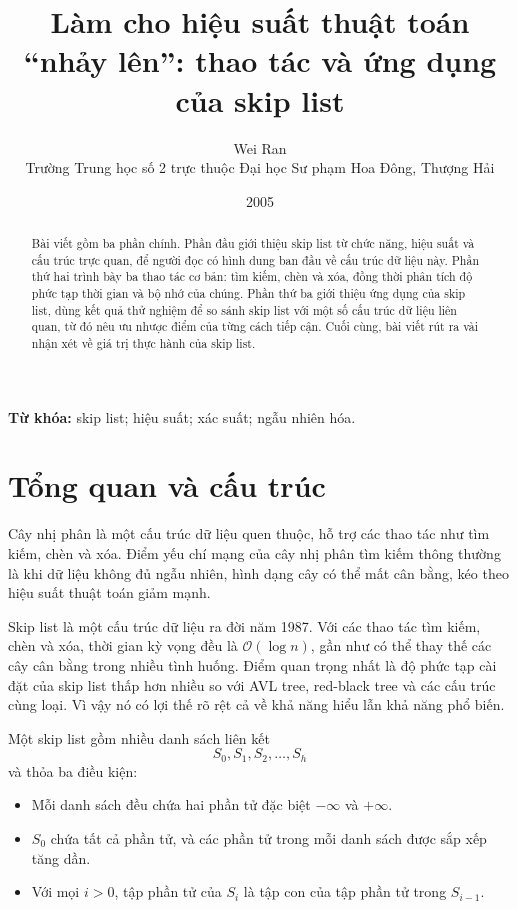 \documentclass[11pt]{article}
\title{Làm cho hiệu suất thuật toán ``nhảy lên'': thao tác và ứng dụng của skip list}
\author{Wei Ran\\Trường Trung học số 2 trực thuộc Đại học Sư phạm Hoa Đông, Thượng Hải}
\date{2005}
\newcommand{\Oh}{\mathcal{O}}
\begin{document}
\maketitle


\renewcommand{\abstractname}{Tóm tắt}
\begin{abstract}
Bài viết gồm ba phần chính. Phần đầu giới thiệu skip list từ chức năng, hiệu
suất và cấu trúc trực quan, để người đọc có hình dung ban đầu về cấu trúc dữ
liệu này. Phần thứ hai trình bày ba thao tác cơ bản: tìm kiếm, chèn và xóa,
đồng thời phân tích độ phức tạp thời gian và bộ nhớ của chúng. Phần thứ ba
giới thiệu ứng dụng của skip list, dùng kết quả thử nghiệm để so sánh skip
list với một số cấu trúc dữ liệu liên quan, từ đó nêu ưu nhược điểm của từng
cách tiếp cận. Cuối cùng, bài viết rút ra vài nhận xét về giá trị thực hành
của skip list.
\end{abstract}

\noindent\textbf{Từ khóa:} skip list; hiệu suất; xác suất; ngẫu nhiên hóa.

\section{Tổng quan và cấu trúc}

Cây nhị phân là một cấu trúc dữ liệu quen thuộc, hỗ trợ các thao tác như tìm
kiếm, chèn và xóa. Điểm yếu chí mạng của cây nhị phân tìm kiếm thông thường
là khi dữ liệu không đủ ngẫu nhiên, hình dạng cây có thể mất cân bằng, kéo
theo hiệu suất thuật toán giảm mạnh.

Skip list là một cấu trúc dữ liệu ra đời năm 1987. Với các thao tác tìm kiếm,
chèn và xóa, thời gian kỳ vọng đều là \(\Oh(\log n)\), gần như có thể thay thế
các cây cân bằng trong nhiều tình huống. Điểm quan trọng nhất là độ phức tạp
cài đặt của skip list thấp hơn nhiều so với AVL tree, red-black tree và các
cấu trúc cùng loại. Vì vậy nó có lợi thế rõ rệt cả về khả năng hiểu lẫn khả
năng phổ biến.

Một skip list gồm nhiều danh sách liên kết
\[
  S_0,S_1,S_2,\ldots,S_h
\]
và thỏa ba điều kiện:
\begin{itemize}
  \item Mỗi danh sách đều chứa hai phần tử đặc biệt \(-\infty\) và \(+\infty\).
  \item \(S_0\) chứa tất cả phần tử, và các phần tử trong mỗi danh sách được
  sắp xếp tăng dần.
  \item Với mọi \(i>0\), tập phần tử của \(S_i\) là tập con của tập phần tử
  trong \(S_{i-1}\).
\end{itemize}
\end{document}
